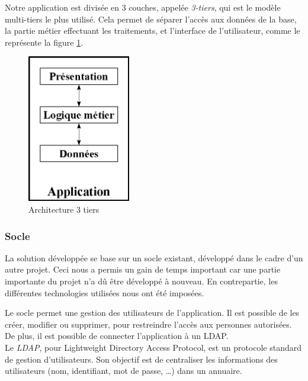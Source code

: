 Notre application est divisée en 3 couches, appelée \textit{3-tiers}, qui est le modèle multi-tiers le plus utilisé.
Cela permet de séparer l'accès aux données de la base, la partie métier effectuant les traitements, et l'interface de l'utilisateur, comme le représente la figure \ref{architecture_3_tiers}.
\begin{figure}[!h]
	\center
	\includegraphics[width=0.4\textwidth]{img/architecture_3_tiers.png}
	\caption{Architecture 3 tiers}
	\label{architecture_3_tiers}
\end{figure}


\subsubsection{Socle}

La solution développée se base sur un socle existant, développé dans le cadre d'un autre projet.
Ceci nous a permis un gain de temps important car une partie importante du projet n'a dû être développé à nouveau.
En contrepartie, les différentes technologies utilisées nous ont été imposées.



Le socle permet une gestion des utilisateurs de l'application.
Il est possible de les créer, modifier ou supprimer, pour restreindre l'accès aux personnes autorisées.
De plus, il est possible de connecter l'application à un LDAP.
\\

Le \textit{LDAP}, pour Lightweight Directory Access Protocol, est un protocole standard de gestion d'utilisateurs.
Son objectif est de centraliser les informations des utilisateurs (nom, identifiant, mot de passe, \ldots) dans un annuaire.

